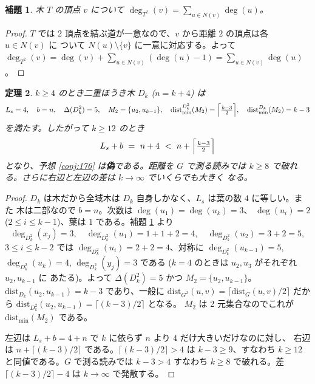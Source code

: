 \documentclass[paper=a4,fontsize=10.5pt,jafontsize=10.5pt]{jlreq}
\theoremstyle{plain}
\newtheorem{theorem}{定理}[section]
\newtheorem{lemma}[theorem]{補題}
\theoremstyle{definition}
\begin{document}
\begin{lemma}\label{lem:treesq}
木 $T$ の頂点 $v$ について $\deg_{T^2}(v) = \sum_{u \in N(v)} \deg(u)$。
\end{lemma}

\begin{proof}
$T$ では 2 頂点を結ぶ道が一意なので、$v$ から距離 $2$ の頂点は各 $u \in N(v)$ に
ついて $N(u) \setminus \{v\}$ に一意に対応する。よって
$\deg_{T^2}(v) = \deg(v) + \sum_{u \in N(v)} (\deg(u) - 1)
= \sum_{u \in N(v)} \deg(u)$。
\end{proof}

\begin{theorem}\label{thm:176}
$k \ge 4$ のとき二重ほうき木 $D_k$ ($n = k+4$) は
\[ L_s = 4, \quad b = n, \quad \Delta(D_k^2) = 5, \quad
   M_2 = \{u_2, u_{k-1}\}, \quad
   \mathrm{dist}_{\min}^{D_k^2}(M_2)
   = \Bigl\lceil \tfrac{k-3}{2} \Bigr\rceil, \quad
   \mathrm{dist}_{\min}^{D_k}(M_2) = k - 3 \]
を満たす。したがって $k \ge 12$ のとき
\[ L_s + b \ = \ n + 4 \ < \ n + \Bigl\lceil \tfrac{k-3}{2}
   \Bigr\rceil \]
となり、予想 \ref{conj:176} は\textbf{偽}である。距離を $G$ で測る読みでは
$k \ge 8$ で破れる。さらに右辺と左辺の差は $k \to \infty$ でいくらでも大きく
なる。
\end{theorem}

\begin{proof}
$D_k$ は木だから全域木は $D_k$ 自身しかなく、$L_s$ は葉の数 $4$ に等しい。また
木は二部なので $b = n$。次数は $\deg(u_1) = \deg(u_k) = 3$、
$\deg(u_i) = 2$ ($2 \le i \le k-1$)、葉は $1$ である。補題 \ref{lem:treesq}
より
\[ \deg_{D_k^2}(x_j) = 3, \quad \deg_{D_k^2}(u_1) = 1 + 1 + 2 = 4, \quad
   \deg_{D_k^2}(u_2) = 3 + 2 = 5, \]
$3 \le i \le k-2$ では $\deg_{D_k^2}(u_i) = 2 + 2 = 4$、対称に
$\deg_{D_k^2}(u_{k-1}) = 5$, $\deg_{D_k^2}(u_k) = 4$, $\deg_{D_k^2}
(y_j) = 3$ である ($k = 4$ のときは $u_2, u_3$ がそれぞれ $u_2, u_{k-1}$ に
あたる)。よって $\Delta(D_k^2) = 5$ かつ $M_2 = \{u_2, u_{k-1}\}$。
$\mathrm{dist}_{D_k}(u_2, u_{k-1}) = k - 3$ であり、一般に
$\mathrm{dist}_{G^2}(u,v) = \lceil \mathrm{dist}_G(u,v)/2 \rceil$ だから
$\mathrm{dist}_{D_k^2}(u_2, u_{k-1}) = \lceil (k-3)/2 \rceil$ となる。
$M_2$ は 2 元集合なのでこれが $\mathrm{dist}_{\min}(M_2)$ である。

左辺は $L_s + b = 4 + n$ で $k$ に依らず $n$ より $4$ だけ大きいだけなのに対し、
右辺は $n + \lceil (k-3)/2 \rceil$ である。$\lceil (k-3)/2 \rceil > 4$ は
$k - 3 \ge 9$、すなわち $k \ge 12$ と同値である。$G$ で測る読みでは
$k - 3 > 4$ すなわち $k \ge 8$ で破れる。差 $\lceil (k-3)/2 \rceil - 4$ は
$k \to \infty$ で発散する。
\end{proof}
\end{document}
